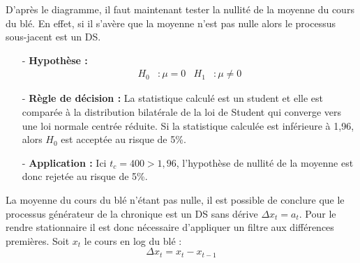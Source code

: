 %
D'après le diagramme, il faut maintenant tester la nullité de la moyenne du cours du blé. En effet, si il s'avère que la moyenne n'est pas nulle alors le processus 
sous-jacent est un DS.
\begin{itemize}
    \item[-]\textbf{Hypothèse :}
\begin{align*}
    H_{0} &: \mu = 0 & H_{1} &: \mu \neq 0
\end{align*}
\item[-]\textbf{Règle de décision :} La statistique calculé est un student et elle est comparée à la distribution bilatérale de la loi de Student qui converge vers une loi normale centrée réduite. Si la statistique calculée est inférieure à 1,96, alors $H_{0}$ est acceptée au risque de 5\%.
\item[-]\textbf{Application :} Ici $t_{c} = 400 > 1,96$, l'hypothèse de nullité de la moyenne est donc rejetée au risque de 5\%.
\end{itemize}
La moyenne du cours du blé n'étant pas nulle, il est possible de conclure que le processus générateur de la chronique est un DS sans dérive $\Delta x_{t} = a_{t}$. Pour le 
rendre stationnaire il est donc nécessaire d'appliquer un filtre aux différences premières. Soit $x_{t}$ le cours en log du blé :
\begin{equation*}
    \Delta x_{t} = x_{t} - x_{t-1}
\end{equation*}
